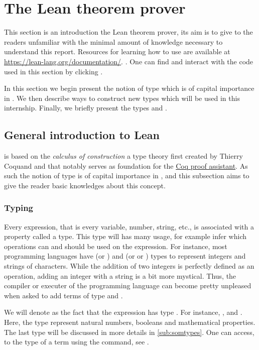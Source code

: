 \section{The Lean theorem prover}
\label{sec:lean-intro}

This section is an introduction the Lean theorem prover, its aim is to give to the readers unfamiliar with \Lean the minimal amount of knowledge necessary to understand this report. Resources for learning how to use \Lean are available at \url{https://lean-lang.org/documentation/}.
. One can find and interact with the code used in this section by clicking \editor. 

In this section we begin present the notion of type which is of capital importance in \Lean. We then describe ways to construct new types which will be used in this internship. Finally, we briefly present the types  and .

\subsection{General introduction to Lean}%
\label{sub:Introduction to type theory}

\Lean is based on the \emph{calculus of construction} a type theory first created by Thierry Coquand and that notably serves as foundation for the \href{https://coq.inria.fr/}{Coq proof assistant}. As such the notion of type is of capital importance in \Lean, and this subsection aims to give the reader basic knowledges about this concept.

\subsubsection{Typing}
  Every \Lean expression, that is every variable, number, string, etc., is associated with a property called a type. This type will has many usage, for example infer which operations can and should be used on the expression. For instance, most programming languages have  (or ) and  (or  or ) types to represent integers and strings of characters. While the addition of two integers is perfectly defined as an operation, adding an integer with a string is a bit more mystical. Thus, the compiler or executer of the programming language can become pretty unpleased when asked to add terms of type  and .

  We will denote as  the fact that the expression  has type . For instance, ,  and . Here, the type  represent natural numbers,  booleans and  mathematical properties. The last type will be discussed in more details in \ref{sub:somtypes}. One can access, to the type of a term using the  command, see \editor.

